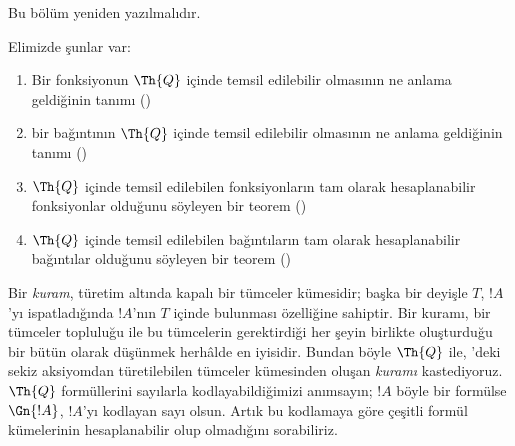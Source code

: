\documentclass[../../../include/open-logic-section]{subfiles}
\begin{document}


\begin{editorial}
Bu bölüm yeniden yazılmalıdır.
\end{editorial}

Elimizde şunlar var:
\begin{enumerate}
\item Bir fonksiyonun $\Th{Q}$ içinde temsil edilebilir olmasının ne anlama
  geldiğinin tanımı ()
\item bir bağıntının $\Th{Q}$ içinde temsil edilebilir olmasının ne anlama
  geldiğinin tanımı ()
\item $\Th{Q}$ içinde temsil edilebilen fonksiyonların tam olarak
  hesaplanabilir fonksiyonlar olduğunu söyleyen bir teorem
  ()
\item $\Th{Q}$ içinde temsil edilebilen bağıntıların tam olarak
  hesaplanabilir bağıntılar olduğunu söyleyen bir teorem
  ()
\end{enumerate}

Bir {\em kuram}, türetim altında kapalı bir tümceler kümesidir; başka bir
deyişle $T$, $!A$'yı ispatladığında $!A$'nın $T$ içinde bulunması özelliğine
sahiptir. Bir kuramı, bir tümceler topluluğu ile bu tümcelerin gerektirdiği
her şeyin birlikte oluşturduğu bir bütün olarak düşünmek herhâlde en
iyisidir. Bundan böyle $\Th{Q}$ ile, 'deki sekiz
aksiyomdan türetilebilen tümceler kümesinden oluşan {\em kuramı}
kastediyoruz. $\Th{Q}$ formüllerini sayılarla kodlayabildiğimizi anımsayın;
$!A$ böyle bir formülse $\Gn{!A}$, $!A$'yı kodlayan sayı olsun. Artık bu
kodlamaya göre çeşitli formül kümelerinin hesaplanabilir olup olmadığını
sorabiliriz.
\end{document}
